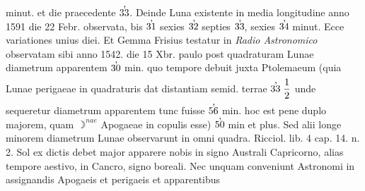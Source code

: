 minut. et die praecedente $33\hspace{-6pt}\raisebox{9pt}{,}\protect\hspace{3pt}$. Deinde Luna\protect{} existente in media  longitudine anno 1591 die 22 Febr. observata, bis $31\hspace{-6pt}\raisebox{9pt}{,}\protect\hspace{3pt}$ sexies $32\hspace{-6pt}\raisebox{9pt}{,}\protect\hspace{3pt}$ septies  $33\hspace{-6pt}\raisebox{9pt}{,}\protect\hspace{3pt}$, sexies $34\hspace{-6pt}\raisebox{9pt}{,}\protect\hspace{3pt}$ minut. Ecce variationes unius diei. Et Gemma Frisius\protect{}  testatur in \textit{Radio Astronomico} observatam sibi anno 1542. die 15 Xbr. paulo  post quadraturam Lunae\protect{} diametrum apparentem $30\hspace{-6pt}\raisebox{9pt}{,}\protect\hspace{3pt}$ min. quo  tempore debuit juxta Ptolemaeum\protect{}  (quia Lunae\protect{} perigaeae\protect{} in quadraturis  dat distantiam semid. terrae\protect{} $33\hspace{-6pt}\raisebox{9pt}{,}\protect\hspace{6pt}\displaystyle\frac{1}{2}\rule[-4mm]{0mm}{10mm}$ unde sequeretur diametrum apparentem  tunc fuisse $56\hspace{-6pt}\raisebox{9pt}{,}\protect\hspace{3pt}$ min. hoc est pene  duplo majorem, quam $\rightmoon^{nae}$\protect{} Apogaeae\protect{}  in copulis esse) $50\hspace{-6pt}\raisebox{9pt}{,}\protect\hspace{3pt}$ min et plus. Sed  alii longe minorem diametrum Lunae\protect{}  observarunt in omni quadra. Ricciol.\protect{} lib. 4 cap. 14. n. 2. Sol\protect{} ex dictis  debet major apparere nobis  in signo Australi Capricorno\protect{},  alias  tempore aestivo, in Cancro\protect{}, signo  boreali. Nec unquam conveniunt  Astronomi in assignandis Apogaeis\protect{}  et perigaeis\protect{} et apparentibus 
